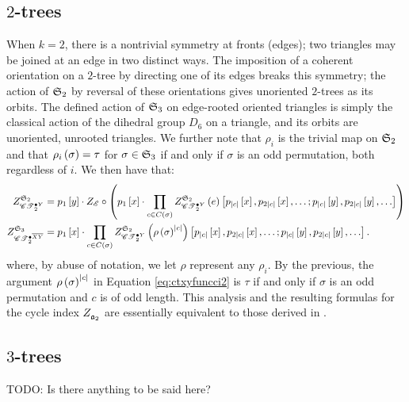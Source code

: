 \documentclass[sectionflow,singlespace,twoside,boldmathhdr,draft]{brandiss} %
\numberwithin{section}{chapter}
\numberwithin{figure}{chapter}
\begin{document}
\subsection{$2$-trees}
When $k=2$, there is a nontrivial symmetry at fronts (edges); two triangles may be joined at an edge in two distinct ways.
The imposition of a coherent orientation on a $2$-tree by directing one of its edges breaks this symmetry; the action of $\symgp{2}$ by reversal of these orientations gives unoriented $2$-trees as its orbits.
The defined action of $\symgp{3}$ on edge-rooted oriented triangles is simply the classical action of the dihedral group $D_{6}$ on a triangle, and its orbits are unoriented, unrooted triangles.
We further note that $\rho_{i}$ is the trivial map on $\symgp{2}$ and that $\rho_{i} \pbrac{\sigma} = \tau$ for $\sigma \in \symgp{3}$ if and only if $\sigma$ is an odd permutation, both regardless of $i$.
We then have that:
\begin{subequations}
  \label{eq:rest2trees}
  \begin{align}
    \gci{\symgp{2}}{\pointed[Y]{\specname{CT}}_{2}} &= p_{1} \sbrac{y} \cdot Z_{\specname{E}} \circ \pbrac{p_{1} \sbrac{x} \cdot \prod_{c \in C \pbrac{\sigma}} \gci{\symgp{2}}{\pointed[Y]{\specname{CT}}_{2}} \pbrac{e} \sbrac{p_{\abs{c}} \sbrac{x}, p_{2 \abs{c}} \sbrac{x}, \dots; p_{\abs{c}} \sbrac{y}, p_{2 \abs{c}} \sbrac{y}, \dots}} \label{eq:ctyfuncci2} \\
    \gci{\symgp{3}}{\pointed[\overline{XY}]{\specname{CT}}_{2}} &= p_{1} \sbrac{x} \cdot \prod_{c \in C \pbrac{\sigma}} \gci{\symgp{2}}{\pointed[Y]{\specname{CT}}_{2}} \pbrac{\rho \pbrac{\sigma}^{\abs{c}}} \sbrac{p_{\abs{c}} \sbrac{x}, p_{2 \abs{c}} \sbrac{x}, \dots; p_{\abs{c}} \sbrac{y}, p_{2 \abs{c}} \sbrac{y}, \dots}. \label{eq:ctxyfuncci2}
  \end{align}
\end{subequations}
where, by abuse of notation, we let $\rho$ represent any $\rho_{i}$.
By the previous, the argument $\rho \pbrac{\sigma}^{\abs{c}}$ in Equation \eqref{eq:ctxyfuncci2} is $\tau$ if and only if $\sigma$ is an odd permutation and $c$ is of odd length.
This analysis and the resulting formulas for the cycle index $\ci{\mathfrak{a}_{2}}$ are essentially equivalent to those derived in \cite{gessel:spec2trees}.

\subsection{$3$-trees}
TODO: Is there anything to be said here?
\end{document}
